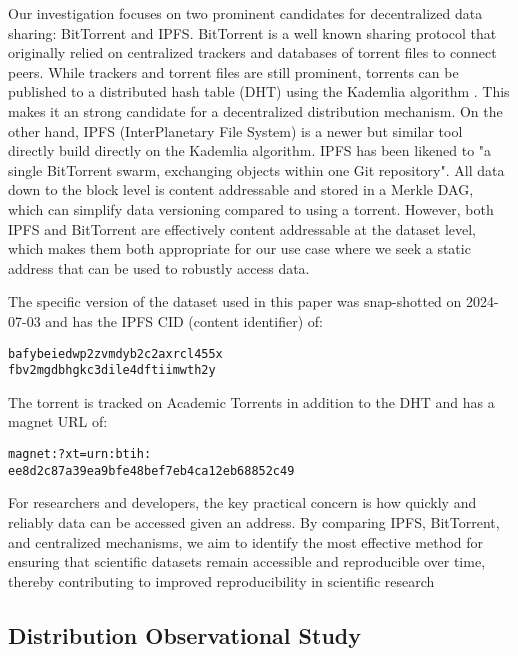 \documentclass[10pt,twocolumn,letterpaper]{article}
\begin{document}
Our investigation focuses on two prominent candidates for decentralized data sharing:
BitTorrent and IPFS.
BitTorrent \cite{cohen_incentives_2003, cohen_bittorrent_2017} is a well known sharing protocol that
  originally relied on centralized trackers and databases of torrent files to connect peers.
While trackers and torrent files are still prominent, torrents can be published to a distributed hash table
  (DHT) using the Kademlia algorithm \cite{maymounkov_kademlia_2002}.
This makes it an strong candidate for a decentralized distribution mechanism.
On the other hand, IPFS (InterPlanetary File System) \cite{benet_ipfs_2014, bieri_overview_2021} is a newer
  but similar tool directly build directly on the Kademlia algorithm.
IPFS has been likened to "a single BitTorrent swarm, exchanging objects within one Git repository".
All data down to the block level is content addressable and stored in a Merkle DAG, which can simplify data
  versioning compared to using a torrent.
However, both IPFS and BitTorrent are effectively content addressable at the dataset level, which makes them
  both appropriate for our use case where we seek a static address that can be used to robustly access data.

The specific version of the dataset used in this paper was snap-shotted on
2024-07-03 and has the IPFS CID (content identifier) of:

\begin{lstlisting}[basicstyle=\normalsize]
bafybeiedwp2zvmdyb2c2axrcl455x
fbv2mgdbhgkc3dile4dftiimwth2y
\end{lstlisting}

The torrent is tracked on Academic Torrents \cite{academic_torrents_Cohen2014}
in addition to the DHT and has a magnet URL of:

\begin{lstlisting}[basicstyle=\normalsize]
magnet:?xt=urn:btih:
ee8d2c87a39ea9bfe48bef7eb4ca12eb68852c49
\end{lstlisting}

For researchers and developers, the key practical concern is how quickly and reliably data can be accessed
  given an address.
By comparing IPFS, BitTorrent, and centralized mechanisms, we aim to identify the most effective method for
  ensuring that scientific datasets remain accessible and reproducible over time, thereby contributing to
  improved reproducibility in scientific research


\subsection{Distribution Observational Study}
\end{document}
